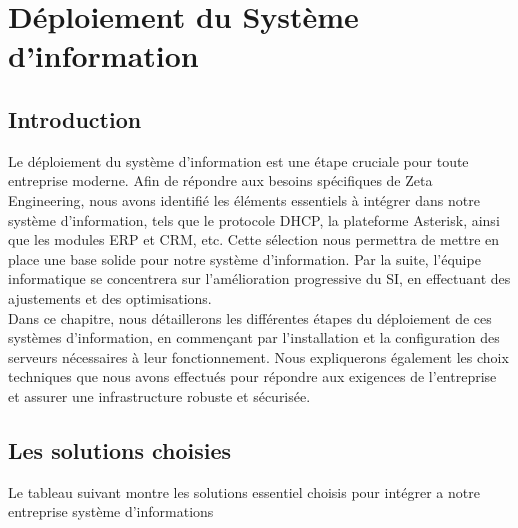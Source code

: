 \chapter{Déploiement du Système d'information}


\section{Introduction}


Le déploiement du système d'information est une étape cruciale pour toute entreprise moderne. Afin de répondre aux besoins spécifiques de Zeta Engineering, nous avons identifié les éléments essentiels à intégrer dans notre système d'information, tels que le protocole DHCP, la plateforme Asterisk, ainsi que les modules ERP et CRM, etc. Cette sélection nous permettra de mettre en place une base solide pour notre système d'information. Par la suite, l'équipe informatique se concentrera sur l'amélioration progressive du SI, en effectuant des ajustements et des optimisations. \\


Dans ce chapitre, nous détaillerons les différentes étapes du déploiement de ces systèmes d'information, en commençant par l'installation et la configuration des serveurs nécessaires à leur fonctionnement. Nous expliquerons également les choix techniques que nous avons effectués pour répondre aux exigences de l'entreprise et assurer une infrastructure robuste et sécurisée. \cite{opg} \\


\newpage


\section{Les solutions choisies}

Le tableau suivant montre les solutions essentiel choisis pour intégrer a notre entreprise système d'informations 

